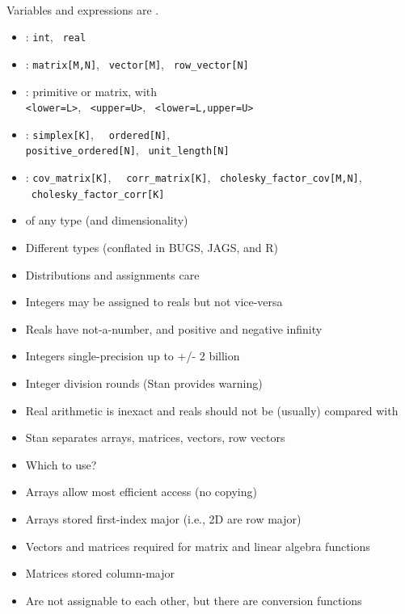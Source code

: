 \documentclass[10pt]{report}
\begin{document}
%
\\[3pt]
\hspace*{17pt}Variables and expressions are .
\begin{itemize}
\item {}: {\tt\small int}, \ {\tt\small real}
\item {}: {\tt\small matrix[M,N]}, \ {\tt\small vector[M]}, \ {\tt\small row\_vector[N]}
\item {}: primitive or matrix, with 
  \\ {\tt\small <lower=L>}, \ {\tt\small <upper=U>}, \ {\tt\small <lower=L,upper=U>}
\item {}: {\tt\small simplex[K]}, \ {\tt\small
    ordered[N]},
  \\ {\tt\small positive\_ordered[N]}, \ {\tt\small unit\_length[N]}
\item {}: {\tt\small cov\_matrix[K]}, \ {\tt\small
    corr\_matrix[K]}, \ {\tt\small cholesky\_factor\_cov[M,N]}, \
  {\tt\small cholesky\_factor\_corr[K]}
\item {}  of any type (and dimensionality)
\end{itemize}


%
\begin{itemize}
\item Different types (conflated in BUGS, JAGS, and R)
\item Distributions and assignments care
\item Integers may be assigned to reals but not vice-versa
\item Reals have not-a-number, and positive and negative infinity
\item Integers single-precision up to +/- 2 billion
\item Integer division rounds (Stan provides warning)
\item Real arithmetic is inexact and reals should not be (usually) compared with \code{==}
\end{itemize}


%
\begin{itemize}
\item Stan separates arrays, matrices, vectors, row vectors
\item Which to use?
\item Arrays allow most efficient access (no copying)
\item Arrays stored first-index major (i.e., 2D are row major)
\item Vectors and matrices required for matrix and linear algebra functions
\item Matrices stored column-major
\item Are not assignable to each other, but there are conversion functions
\end{itemize}
\end{document}
